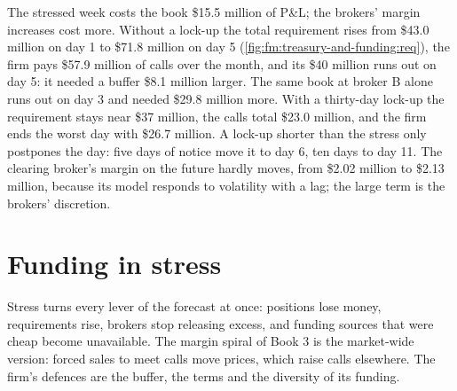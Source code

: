 The stressed week costs the book \$15.5 million of P\&L; the brokers' margin increases cost more. Without a lock-up the total requirement rises from
\$43.0 million on day 1 to \$71.8 million on day 5 (\cref{fig:fm:treasury-and-funding:req}), the firm pays \$57.9 million of calls over the month,
and its \$40 million runs out on day 5: it needed a buffer \$8.1 million larger. The same book at broker B alone runs out on day 3 and needed \$29.8
million more. With a thirty-day lock-up the requirement stays near \$37 million, the calls total \$23.0 million, and the firm ends the worst day with
\$26.7 million. A lock-up shorter than the stress only postpones the day: five days of notice move it to day 6, ten days to day 11. The clearing
broker's margin on the future hardly moves, from \$2.02 million to \$2.13 million, because its model responds to volatility with a lag; the large
term is the brokers' discretion.

\begin{omfigure}

\label{fig:fm:treasury-and-funding:req}
\end{omfigure}

\section{Funding in stress}

Stress turns every lever of the forecast at once: positions lose money, requirements rise, brokers stop releasing excess, and funding sources
that were cheap become unavailable. The margin spiral of Book 3 is the market-wide version: forced sales to meet calls move prices, which raise
calls elsewhere. The firm's defences are the buffer, the terms and the diversity of its funding.

